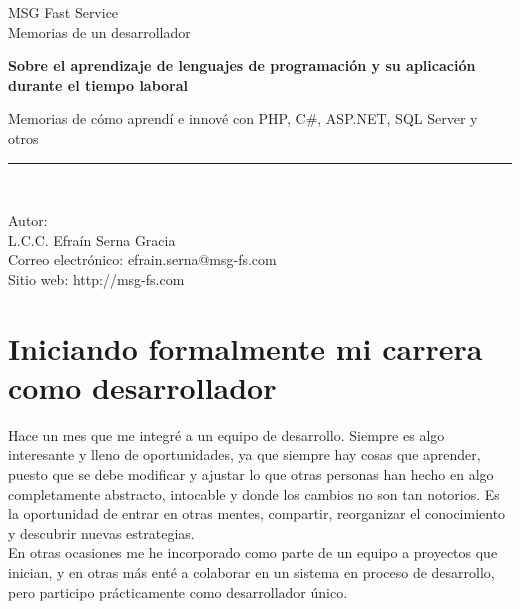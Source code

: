 \documentclass[12pt,spanish,lettersize]{book}
\begin{document}
\begin{titlepage}
\begin{center}
MSG Fast Service\\
\vspace*{0.15in}
Memorias de un desarrollador \\
\vspace*{0.6in}
\vspace*{0.2in}
\begin{Large}
\textbf{Sobre el aprendizaje de lenguajes de programaci\'on y su aplicaci\'on durante el tiempo laboral} \\
\end{Large}
\vspace*{0.3in}
\begin{large}
Memorias de c\'omo aprend\'i e innov\'e con PHP, C\#, ASP.NET, SQL Server y otros\\
\end{large}
\vspace*{0.3in}
\rule{80mm}{0.1mm}\\
\vspace*{0.1in}
\begin{large}
Autor: \\
L.C.C. Efra\'in Serna Gracia \\
\vspace*{0.3in}
Correo electr\'onico: efrain.serna@msg-fs.com\\
Sitio web: http://msg-fs.com
\end{large}
\end{center}
\end{titlepage}
\tableofcontents
\chapter{Iniciando formalmente mi carrera como desarrollador}
Hace un mes que me integr\'e a un equipo de desarrollo. Siempre es algo interesante y lleno de oportunidades, ya que siempre hay cosas que aprender, puesto que se debe modificar y ajustar lo que otras personas han hecho en algo completamente abstracto, intocable y donde los cambios no son tan notorios. Es la oportunidad de entrar en otras mentes, compartir, reorganizar el conocimiento y descubrir nuevas estrategias.\\

En otras ocasiones me he incorporado como parte de un equipo a proyectos que inician, y en otras m\'as ent\'e a colaborar en un sistema en proceso de desarrollo, pero participo pr\'acticamente como desarrollador \'unico.\\
\end{document}
